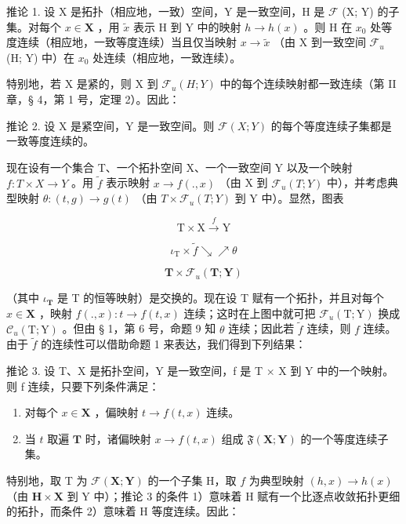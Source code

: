 推论 1. 设 X 是拓扑（相应地，一致）空间，Y 是一致空间，H 是 \(\mathcal{F}\) (X; Y) 的子集。对每个 \(x \in \mathbf{X}\) ，用 \(\tilde{x}\) 表示 H 到 Y 中的映射 \(h \to h(x)\) 。则 H 在 \(x_0\) 处等度连续（相应地，一致等度连续）当且仅当映射 \(x \to \tilde{x}\) （由 X 到一致空间 \(\mathcal{F}_u\) (H; Y) 中）在 \(x_0\) 处连续（相应地，一致连续）。

特别地，若 X 是紧的，则 X 到 \(\mathcal{F}_{u}(H;Y)\) 中的每个连续映射都一致连续（第 II 章，§ 4，第 1 号，定理 2）。因此：

推论 2. 设 X 是紧空间，Y 是一致空间。则 \(\mathcal{F}(X;Y)\) 的每个等度连续子集都是一致等度连续的。

现在设有一个集合 T、一个拓扑空间 X、一个一致空间 Y 以及一个映射 \(f: T \times X \to Y\) 。用 \(\tilde{f}\) 表示映射 \(x \to f(., x)\) （由 X 到 \(\mathcal{F}_{u}(T; Y)\) 中），并考虑典型映射 \(\theta: (t, g) \to g(t)\) （由 \(T \times \mathcal{F}_{u}(T; Y)\) 到 Y 中）。显然，图表

\[
\mathrm{T} \times \mathrm{X} \xrightarrow {f} \mathrm{Y}
\]

\[
\iota_ {\mathrm{T}} \times \tilde {f} \searrow \nearrow \theta
\]

\[
\mathbf {T} \times \mathcal {F} _ {u} (\mathbf {T}; \mathbf {Y})
\]

（其中 \(\iota_{\mathbf{T}}\) 是 T 的恒等映射）是交换的。现在设 T 赋有一个拓扑，并且对每个 \(x \in \mathbf{X}\) ，映射 \(f(., x): t \to f(t, x)\) 连续；这时在上图中就可把 \(\mathcal{F}_{u}(\mathrm{T}; \mathrm{Y})\) 换成 \(\mathcal{C}_{u}(\mathrm{T}; \mathrm{Y})\) 。但由 § 1，第 6 号，命题 9 知 \(\theta\) 连续；因此若 \(\tilde{f}\) 连续，则 \(f\) 连续。由于 \(\tilde{f}\) 的连续性可以借助命题 1 来表达，我们得到下列结果：

推论 3. 设 T、X 是拓扑空间，Y 是一致空间，f 是 T × X 到 Y 中的一个映射。则 f 连续，只要下列条件满足：

\begin{enumerate}
\def\labelenumi{\arabic{enumi})}
\item
  对每个 \(x \in \mathbf{X}\) ，偏映射 \(t \to f(t, x)\) 连续。
\item
  当 \(t\) 取遍 \(\mathbf{T}\) 时，诸偏映射 \(x \to f(t, x)\) 组成 \(\mathfrak{F}(\mathbf{X}; \mathbf{Y})\) 的一个等度连续子集。
\end{enumerate}

特别地，取 T 为 \(\mathcal{F}(\mathbf{X};\mathbf{Y})\) 的一个子集 H，取 \(f\) 为典型映射 \((h,x)\to h(x)\) （由 \(\mathbf{H}\times \mathbf{X}\) 到 Y 中）；推论 3 的条件 1）意味着 H 赋有一个比逐点收敛拓扑更细的拓扑，而条件 2）意味着 H 等度连续。因此：

